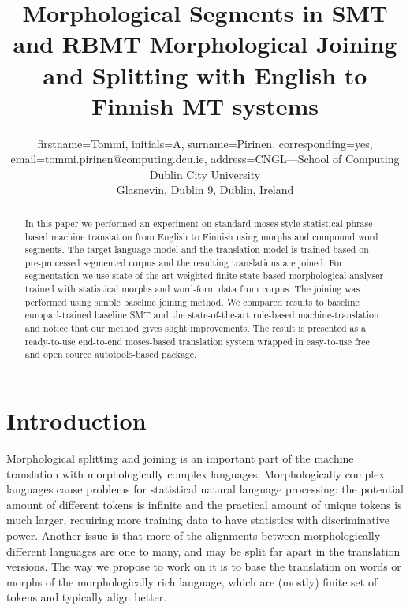 \documentclass[color]{pbml}
\begin{document}
\title{Morphological Segments in SMT and RBMT\titlelinebreak{}
Morphological Joining and Splitting with English to Finnish MT systems}



\author{
  firstname=Tommi,
  initials=A,
  surname=Pirinen,
  corresponding=yes,
  email={tommi.pirinen@computing.dcu.ie},
  address={CNGL---School of Computing\\
  Dublin City University\\
  Glasnevin, Dublin 9, Dublin, Ireland}
}


\PBMLmaketitle


\begin{abstract} 
    In this paper we performed an experiment on standard moses
    style statistical phrase-based machine translation from English to Finnish
    using morphs and compound word segments. The target language model and the
    translation model is trained based on pre-processed segmented corpus and
    the resulting translations are joined. For segmentation we use
    state-of-the-art weighted finite-state based morphological analyser trained
    with statistical morphs and word-form data from corpus. The joining was
    performed using simple baseline joining method.  We compared results to
    baseline europarl-trained baseline SMT and the state-of-the-art rule-based
    machine-translation and notice that our method gives slight improvements.
    The result is presented as a ready-to-use end-to-end moses-based translation
    system wrapped in easy-to-use free and open source autotools-based package.
\end{abstract}

\section{Introduction}

Morphological splitting and joining is an important part of the machine
translation with morphologically complex languages. Morphologically complex
languages cause problems for statistical natural language processing:
the potential amount of different tokens is infinite and the practical amount
of unique tokens is much larger, requiring more training data to have statistics
with discriminative power. Another issue is that more of the alignments between
morphologically different languages are one to many, and may be split far apart
in the translation versions. The way we propose to work on it is to base the
translation on words or morphs of the morphologically rich language, which are
(mostly) finite set of tokens and typically align better.
\end{document}
